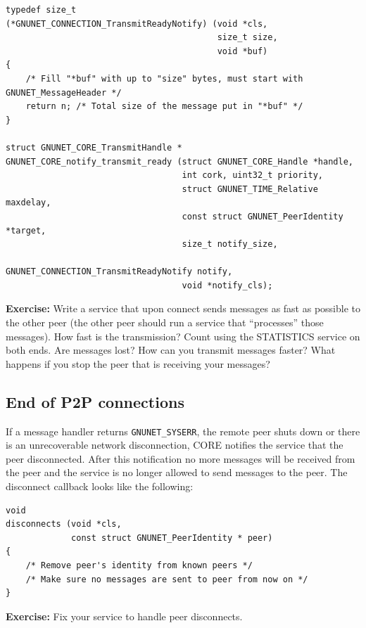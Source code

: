 \documentclass[10pt]{article}
\newcommand{\exercise}[1]{\noindent\begin{boxedminipage}{\textwidth}{\bf Exercise:} #1 \end{boxedminipage}}
\begin{document}
\lstset{language=C}
\begin{lstlisting}
typedef size_t
(*GNUNET_CONNECTION_TransmitReadyNotify) (void *cls,
                                          size_t size,
                                          void *buf)
{
    /* Fill "*buf" with up to "size" bytes, must start with GNUNET_MessageHeader */
    return n; /* Total size of the message put in "*buf" */
}

struct GNUNET_CORE_TransmitHandle *
GNUNET_CORE_notify_transmit_ready (struct GNUNET_CORE_Handle *handle,
                                   int cork, uint32_t priority,
                                   struct GNUNET_TIME_Relative maxdelay,
                                   const struct GNUNET_PeerIdentity *target,
                                   size_t notify_size,
                                   GNUNET_CONNECTION_TransmitReadyNotify notify,
                                   void *notify_cls);
\end{lstlisting}

\exercise{Write a service that upon connect sends messages as
fast as possible to the other peer (the other peer should run a
service that ``processes'' those messages).  How fast is the
transmission?  Count using the STATISTICS service on both ends.  Are
messages lost? How can you transmit messages faster?  What happens if
you stop the peer that is receiving your messages?}


\subsection{End of P2P connections}

If a message handler returns {\tt GNUNET\_SYSERR}, the remote peer shuts down or
there is an unrecoverable network disconnection, CORE notifies the service that
the peer disconnected. After this notification no more messages will be received
from the peer and the service is no longer allowed to send messages to the peer.
The disconnect callback looks like the following:

\lstset{language=C}
\begin{lstlisting}
void
disconnects (void *cls,
             const struct GNUNET_PeerIdentity * peer)
{
    /* Remove peer's identity from known peers */
    /* Make sure no messages are sent to peer from now on */
}
\end{lstlisting}

\exercise{Fix your service to handle peer disconnects.}
\end{document}
